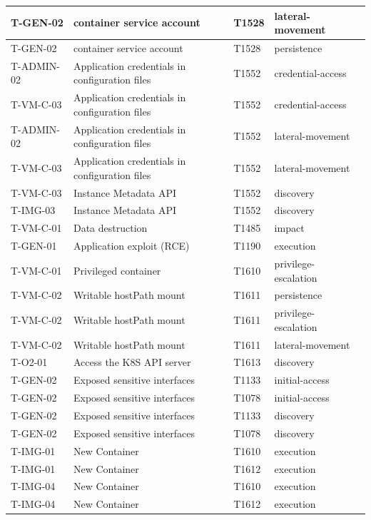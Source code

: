 \begin{longtable}{|l|l|l|l|l|}
T-GEN-02 & container service account & T1528 & lateral-movement \\ \hline
T-GEN-02 & container service account & T1528 & persistence \\ \hline
T-ADMIN-02 & Application credentials in configuration files & T1552 & credential-access \\ \hline
T-VM-C-03 & Application credentials in configuration files & T1552 & credential-access \\ \hline
T-ADMIN-02 & Application credentials in configuration files & T1552 & lateral-movement \\ \hline
T-VM-C-03 & Application credentials in configuration files & T1552 & lateral-movement \\ \hline
T-VM-C-03 & Instance Metadata API & T1552 & discovery \\ \hline
T-IMG-03 & Instance Metadata API & T1552 & discovery \\ \hline
T-VM-C-01 & Data destruction & T1485 & impact \\ \hline
T-GEN-01 & Application exploit (RCE) & T1190 & execution \\ \hline
T-VM-C-01 & Privileged container & T1610 & privilege-escalation \\ \hline
T-VM-C-02 & Writable hostPath mount & T1611 & persistence \\ \hline
T-VM-C-02 & Writable hostPath mount & T1611 & privilege-escalation \\ \hline
T-VM-C-02 & Writable hostPath mount & T1611 & lateral-movement \\ \hline
T-O2-01 & Access the K8S API server & T1613 & discovery \\ \hline
T-GEN-02 & Exposed sensitive interfaces & T1133 & initial-access \\ \hline
T-GEN-02 & Exposed sensitive interfaces & T1078 & initial-access \\ \hline
T-GEN-02 & Exposed sensitive interfaces & T1133 & discovery \\ \hline
T-GEN-02 & Exposed sensitive interfaces & T1078 & discovery \\ \hline
T-IMG-01 & New Container & T1610 & execution \\ \hline
T-IMG-01 & New Container & T1612 & execution \\ \hline
T-IMG-04 & New Container & T1610 & execution \\ \hline
T-IMG-04 & New Container & T1612 & execution \\ \hline
\end{longtable}
\restoregeometry

